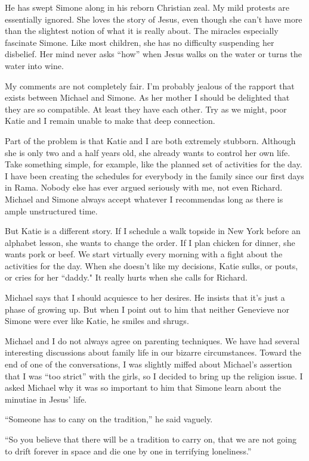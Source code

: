 \documentclass[]{article}
\begin{document}
He has swept Simone along in his reborn Christian zeal.  My mild protests are essentially ignored.  She loves the story of Jesus, even though she can’t have more than the slightest notion of what it is really about.  The miracles especially fascinate Simone.  Like most children, she has no difficulty suspending her disbelief.  Her mind never asks “how” when Jesus walks on the water or turns the water into wine.

My comments are not completely fair.  I’m probably jealous of the rapport that exists between Michael and Simone.  As her mother I should be delighted that they are so compatible.  At least they have each other.  Try as we might, poor Katie and I remain unable to make that deep connection.

Part of the problem is that Katie and I are both extremely stubborn.  Although she is only two and a half years old, she already wants to control her own life.  Take something simple, for example, like the planned set of activities for the day.  I have been creating the schedules for everybody in the family since our first days in Rama.  Nobody else has ever argued seriously with me, not even Richard.  Michael and Simone always accept whatever I recommendas long as there is ample unstructured time.

But Katie is a different story.  If I schedule a walk topside in New York before an alphabet lesson, she wants to change the order.  If I plan chicken for dinner, she wants pork or beef.  We start virtually every morning with a fight about the activities for the day.  When she doesn’t like my decisions, Katie sulks, or pouts, or cries for her “daddy."  It really hurts when she calls for Richard.

Michael says that I should acquiesce to her desires.  He insists that it’s just a phase of growing up.  But when I point out to him that neither Genevieve nor Simone were ever like Katie, he smiles and shrugs.

Michael and I do not always agree on parenting techniques.  We have had several interesting discussions about family life in our bizarre circumstances.  Toward the end of one of the conversations, I was slightly miffed about Michael’s assertion that I was “too strict” with the girls, so I decided to bring up the religion issue.  I asked Michael why it was so important to him that Simone learn about the minutiae in Jesus’ life.

“Someone has to cany on the tradition,” he said vaguely.

“So you believe that there will be a tradition to carry on, that we are not going to drift forever in space and die one by one in terrifying loneliness.”
\end{document}

